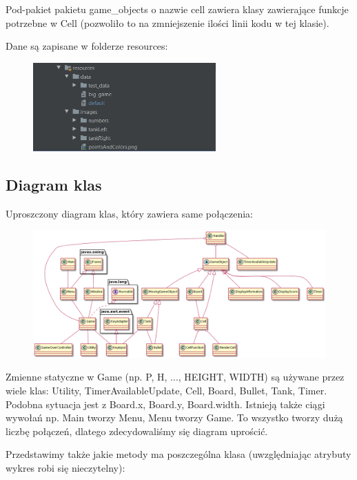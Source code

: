 \documentclass{article}
\begin{document}
Pod-pakiet pakietu game\_objects o nazwie cell zawiera klasy zawierające funkcje potrzebne w Cell (pozwoliło to na zmniejszenie ilości linii kodu w tej klasie).

Dane są zapisane w folderze resources:
\begin{figure} [hbt!]
    \includegraphics[width=7cm,center]{images/resources.JPG}
\end{figure}

\clearpage

\subsection{Diagram klas}
Uproszczony diagram klas, który zawiera same połączenia:
\begin{figure} [hbt!]
    \includegraphics[width=20cm,center]{images/diagram_same_pol.png}
\end{figure}

Zmienne statyczne w Game (np. P, H, ..., HEIGHT, WIDTH) są używane przez wiele klas: Utility, TimerAvailableUpdate, Cell, Board, Bullet, Tank, Timer.
Podobna sytuacja jest z Board.x, Board.y, Board.width. Istnieją także ciągi wywołań np. Main tworzy Menu, Menu tworzy Game. To wszystko tworzy dużą liczbę połączeń, dlatego zdecydowaliśmy się diagram uprościć.
\clearpage

\par Przedstawimy także jakie metody ma poszczególna klasa (uwzględniając atrybuty wykres robi się nieczytelny):
\end{document}
